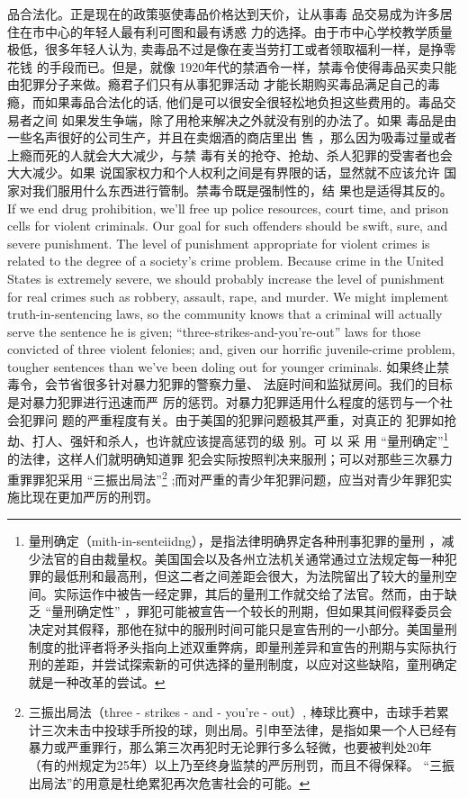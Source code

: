 \begin{paracol}{2}
品合法化。正是现在的政策驱使毒品价格达到天价，让从事毒
品交易成为许多居住在市中心的年轻人最有利可图和最有诱惑
力的选择。由于市中心学校教学质量极低，很多年轻人认为,
卖毒品不过是像在麦当劳打工或者领取福利一样，是挣零花钱
的手段而已。但是，就像 1920年代的禁酒令一样，禁毒令使得毒品买卖只能由犯罪分子来做。瘾君子们只有从事犯罪活动
才能长期购买毒品满足自己的毒瘾，而如果毒品合法化的话,
他们是可以很安全很轻松地负担这些费用的。毒品交易者之间
如果发生争端，除了用枪来解决之外就没有别的办法了。如果
毒品是由一些名声很好的公司生产，并且在卖烟酒的商店里出
售 ，那么因为吸毒过量或者上瘾而死的人就会大大减少，与禁
毒有关的抢夺、抢劫、杀人犯罪的受害者也会大大减少。如果
说国家权力和个人权利之间是有界限的话，显然就不应该允许
国家对我们服用什么东西进行管制。禁毒令既是强制性的，结
果也是适得其反的。
\switchcolumn*
If we end drug prohibition, we'll free up police resources,
court time, and prison cells for violent criminals. Our goal for
such offenders should be swift, sure, and severe punishment.
The level of punishment appropriate for violent crimes is related to the degree of a society's crime problem. Because crime
in the United States is extremely severe, we should probably increase the level of punishment for real crimes such as robbery,
assault, rape, and murder. We might implement truth-in-sentencing laws, so the community knows that a criminal will actually serve the sentence he is given; ``three-strikes-and-you're-out'' laws for those convicted of three violent felonies;
and, given our horrific juvenile-crime problem, tougher sentences than we've been doling out for younger criminals.
\switchcolumn
如果终止禁毒令，会节省很多针对暴力犯罪的警察力量、
法庭时间和监狱房间。我们的目标是对暴力犯罪进行迅速而严
厉的惩罚。对暴力犯罪适用什么程度的惩罚与一个社会犯罪问
题的严重程度有关。由于美国的犯罪问题极其严重，对真正的
犯罪如抢劫、打人、强奸和杀人，也许就应该提高惩罚的级
别。可 以 采 用 “量刑确定”\footnote{量刑确定（mith-in-senteiidng），是指法律明确界定各种刑事犯罪的量刑 ，减少法官的自由裁量权。美国国会以及各州立法机关通常通过立法规定每一种犯罪的最低刑和最高刑，但这二者之间差距会很大，为法院留出了较大的量刑空间。实际运作中被告一经定罪，其后的量刑工作就交给了法官。然而，由于缺乏 “量刑确定性” ，罪犯可能被宣告一个较长的刑期，但如果其间假释委员会决定对其假释，那他在狱中的服刑时间可能只是宣告刑的一小部分。美国量刑制度的批评者将矛头指向上述双重弊病，即量刑差异和宣告的刑期与实际执行刑的差距，并尝试探索新的可供选择的量刑制度，以应对这些缺陷，童刑确定就是一种改革的尝试。}的法律，这样人们就明确知道罪
犯会实际按照判决来服刑；可以对那些三次暴力重罪罪犯采用
“三振出局法”\footnote{三振出局法（three - strikes - and - you’re - out）, 棒球比赛中，击球手若累计三次未击中投球手所投的球，则出局。引申至法律，是指如果一个人已经有暴力或严重罪行，那么第三次再犯时无论罪行多么轻微，也要被判处20年 （有的州规定为25年）以上乃至终身监禁的严厉刑罚，而且不得保释。 “三振出局法”的用意是杜绝累犯再次危害社会的可能。} ;而对严重的青少年犯罪问题，应当对青少年罪犯实施比现在更加严厉的刑罚。

\end{paracol}
